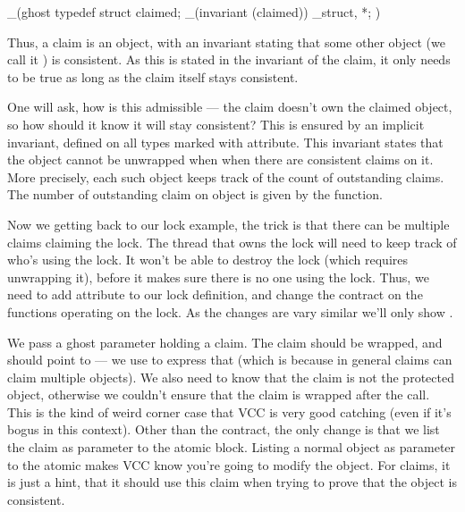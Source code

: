 \begin{VCC}
_(ghost 
typedef struct {
  \object claimed;
  _(invariant \consistent(claimed))
} \claim_struct, *\claim;
)
\end{VCC}

\noindent
Thus, a claim is an object, with an invariant stating that some other object
(we call it ) is consistent.
As this is stated in the invariant of the claim, it only needs to be true
as long as the claim itself stays consistent.

One will ask, how is this admissible --- the claim doesn't own the claimed
object, so how should it know it will stay consistent?
This is ensured by an implicit invariant, defined on all types
marked with  attribute.
This invariant states that the object cannot be unwrapped when
when there are consistent claims on it.
More precisely, each such object keeps track of the count of outstanding
claims.
The number of outstanding claim on object  is given by
the  function.

Now we getting back to our lock example, the trick is that there can be
multiple claims claiming the lock.
The thread that owns the lock will need to keep track of who's using
the lock.
It won't be able to destroy the lock (which requires unwrapping it),
before it makes sure there is no one using the lock.
Thus, we need to add  attribute to our lock
definition, and change the contract on the functions operating
on the lock. As the changes are vary similar we'll only
show .


\noindent
We pass a ghost parameter holding a claim.
The claim should be wrapped, and 
should point to  --- we use 
to express that (which is because in general claims can claim multiple objects).
We also need to know that the claim is not the protected object,
otherwise we couldn't ensure that the claim is wrapped after the call.
This is the kind of weird corner case that VCC is very good catching
(even if it's bogus in this context).
Other than the contract, the only change is that we list the claim
as parameter to the atomic block.
Listing a normal object as parameter to the atomic makes VCC know you're
going to modify the object.
For claims, it is just a hint, that it should use this claim when trying
to prove that the object is consistent.

